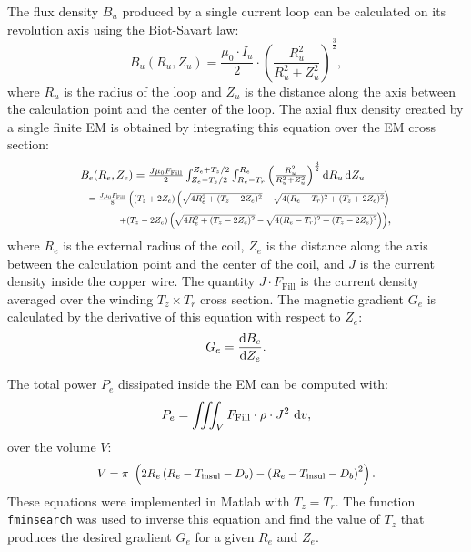 The flux density $B_u$ produced by a single current loop can be calculated on its revolution axis using the Biot-Savart law:
%
\begin{equation}
B_{u}(R_u,Z_u)={\frac{\mu _0\cdot I_{u}}{2}}\cdot\left ( {\frac{R_{u}^2}{R_{u}^2+Z_u^2}} \right )^{\frac{3}{2}},
\label{bloop}
\end{equation}
%
where $R_u$ is the radius of the loop and $Z_u$ is the distance along the axis between the calculation point and the center of the loop.
The axial flux density created by a single finite EM is obtained by integrating this equation over the EM cross section:
%
\begin{align}
&\scalebox{.88}{$
B_e(R_e,Z_e) =
{\frac{J \mu _0   F_{\textrm{Fill}} }{2}} \int_{Z_e-T_z/2}^{Z_e+T_z/2} \int_{R_e-T_r}^{R_e} \left ( {\frac{R_{u}^2}{R_{u}^2+Z_u^2}} \right )^{\frac{3}{2}} \d R_u  \d Z_u 
$} \\
 &~~\scalebox{.7}{$=
  \frac{J \mu _0   F_{\textrm{Fill}}}{8}\left((T_z+2 Z_e) \left(\sqrt{4 R_e^2+(T_z+2 Z_e)^2}-\sqrt{4 (R_e-T_r)^2+(T_z+2 Z_e)^2}\right) \right. 
  $}  \nonumber \\
  & \qquad ~~~ \scalebox{.7}{$\left.+(T_z-2 Z_e) \left(\sqrt{4 R_e^2+(T_z-2 Z_e)^2}-\sqrt{4 (R_e-T_r)^2+(T_z-2 Z_e)^2}\right)\right)$} \nonumber,
\label{Be}
\end{align}
%
where $R_e$ is the external radius of the coil, $Z_e$ is the distance along the axis between the calculation point and the center of the coil, and $J$ is the current density inside the copper wire.
 The quantity $J\cdot F_{\textrm{Fill}} $ is the current density averaged over the winding $T_z \times T_r$ cross section.
  The magnetic gradient $G_e$ is calculated by the derivative of this equation with respect to $Z_e$:
\begin{equation}
G_e=\frac{\operatorname{d}\!{B}_e}{\operatorname{d}\!{Z}_e}.
\label{Ge}
\end{equation}

The total power $P_e$ dissipated inside the EM can be computed with:
%
\begin{equation}
P_e=\iiint_V F_{\textrm{Fill}}  \cdot \rho\cdot J^2 \,\operatorname{d}\!{v}, 
\label{Pe}
\end{equation}
%
over the volume $V$:
\begin{equation}
\scalebox{.9}{$V=\pi\ \left ( 2R_e \left ( R_e- T_{\textrm{insul}} -D_b \right ) -\left ( R_e-T_{\textrm{insul}}-D_b \right )^2\right ).$}
\label{V70cm}
\end{equation}
%
These equations were implemented in {\sc Matlab} with $T_z = T_r$. The function \texttt{fminsearch} was used to inverse this equation and find the value of $T_z$ that produces the desired gradient $G_e$ for a given $R_e$ and $Z_e$.

